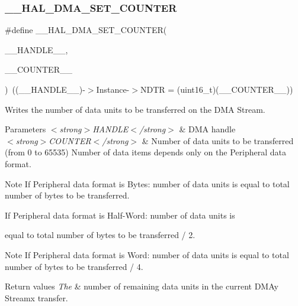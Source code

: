 \subsubsection{\texorpdfstring{\_\_HAL\_DMA\_SET\_COUNTER}{\_\_HAL\_DMA\_SET\_COUNTER}}
{\footnotesize\ttfamily \#define \+\_\+\+\_\+\+H\+A\+L\+\_\+\+D\+M\+A\+\_\+\+S\+E\+T\+\_\+\+C\+O\+U\+N\+T\+ER(\begin{DoxyParamCaption}\item[{}]{\+\_\+\+\_\+\+H\+A\+N\+D\+L\+E\+\_\+\+\_\+,  }\item[{}]{\+\_\+\+\_\+\+C\+O\+U\+N\+T\+E\+R\+\_\+\+\_\+ }\end{DoxyParamCaption})~((\+\_\+\+\_\+\+H\+A\+N\+D\+L\+E\+\_\+\+\_\+)-\/$>$Instance-\/$>$N\+D\+TR = (uint16\+\_\+t)(\+\_\+\+\_\+\+C\+O\+U\+N\+T\+E\+R\+\_\+\+\_\+))}



Writes the number of data units to be transferred on the D\+MA Stream. 


\begin{DoxyParams}{Parameters}
{\em $<$strong$>$\+H\+A\+N\+D\+L\+E$<$/strong$>$} & D\+MA handle \\
\hline
{\em $<$strong$>$\+C\+O\+U\+N\+T\+E\+R$<$/strong$>$} & Number of data units to be transferred (from 0 to 65535) Number of data items depends only on the Peripheral data format.\\
\hline
\end{DoxyParams}
\begin{DoxyNote}{Note}
If Peripheral data format is Bytes\+: number of data units is equal to total number of bytes to be transferred.

If Peripheral data format is Half-\/\+Word\+: number of data units is
\end{DoxyNote}
equal to total number of bytes to be transferred / 2.

\begin{DoxyNote}{Note}
If Peripheral data format is Word\+: number of data units is equal to total number of bytes to be transferred / 4.
\end{DoxyNote}

\begin{DoxyRetVals}{Return values}
{\em The} & number of remaining data units in the current D\+M\+Ay Streamx transfer. \\
\hline
\end{DoxyRetVals}
